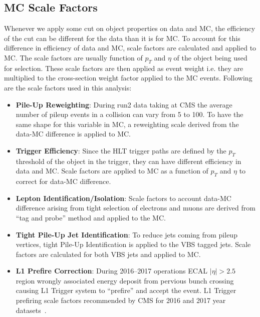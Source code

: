 \subsection{
  MC Scale Factors
}

Whenever we apply some cut on object properties on data and \gls{MC},
the efficiency of the cut can be different for the data than it is for
\gls{MC}. To account for this difference in efficiency
of data and \gls{MC}, scale factors are calculated and applied
to \gls{MC}. The scale factors are usually function of
\( p_T \) and \( \eta \) of the object being used for selection.
These scale factors are then applied as event weight i.e.
they are multiplied to the cross-section weight factor applied to the \gls{MC}
events.
Following are the scale factors used in this analysis:

\begin{itemize}
  \item \textbf{Pile-Up Reweighting}: During run2 data taking at \gls{CMS}
        the average number of pileup events in a collision can vary from 5 to 100.
        To have the same shape for this variable in \gls{MC}, a reweighting
        scale derived from the data-MC difference is applied to \gls{MC}.
  \item \textbf{Trigger Efficiency}: Since the \gls{HLT} trigger paths are defined
        by the \( p_T \) threshold of the object in the trigger,
        they can have different efficiency in data and \gls{MC}. Scale factors
        are applied to \gls{MC} as a function of \( p_T \) and \( \eta \) to correct
        for data-MC difference.
  \item \textbf{Lepton Identification/Isolation}:
        Scale factors to account data-MC difference arising from tight selection
        of electrons and muons are
        derived from ``tag and probe'' method and applied to the \gls{MC}.
  \item \textbf{Tight Pile-Up Jet Identification}:
        To reduce jets coming from pileup vertices, tight Pile-Up Identification
        is applied to the \gls{VBS} tagged jets. Scale factors
        are calculated for both \gls{VBS} jets and applied to \gls{MC}.
  \item \textbf{L1 Prefire Correction}: During 2016--2017 operations \gls{ECAL}
        \(|\eta| > 2.5 \) region wrongly associated energy deposit from
        pervious bunch crossing causing L1 Trigger system to ``prefire'' and accept
        the event.
        L1 Trigger prefiring
        scale factors recommended by \gls{CMS} for 2016 and 2017 year datasets~\cite{cms-l1t}.
\end{itemize}

